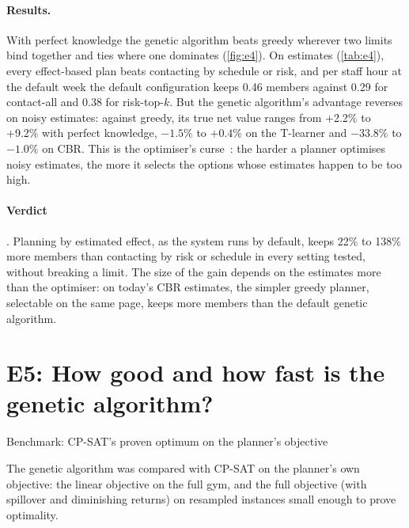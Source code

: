 \paragraph{Results.} With perfect knowledge the genetic algorithm beats greedy wherever two limits bind together and ties where one dominates (\cref{fig:e4}). On estimates (\cref{tab:e4}), every effect-based plan beats contacting by schedule or risk, and per staff hour at the default week the default configuration keeps 0.46 members against 0.29 for contact-all and 0.38 for risk-top-$k$. But the genetic algorithm's advantage reverses on noisy estimates: against greedy, its true net value ranges from +2.2\% to +9.2\% with perfect knowledge, $-1.5\%$ to $+0.4\%$ on the T-learner and $-33.8\%$ to $-1.0\%$ on CBR. This is the optimiser's curse~\cite{smith2006curse}: the harder a planner optimises noisy estimates, the more it selects the options whose estimates happen to be too high.

\paragraph{Verdict} . Planning by estimated effect, as the system runs by default, keeps 22\% to 138\% more members than contacting by risk or schedule in every setting tested, without breaking a limit. The size of the gain depends on the estimates more than the optimiser: on today's CBR estimates, the simpler greedy planner, selectable on the same page, keeps more members than the default genetic algorithm.

\section{E5: How good and how fast is the genetic algorithm?}
\label{sec:e5}
\quad\textsf{\small Benchmark: CP-SAT's proven optimum on the planner's objective}

The genetic algorithm was compared with CP-SAT on the planner's own objective: the linear objective on the full gym, and the full objective (with spillover and diminishing returns) on resampled instances small enough to prove optimality.

